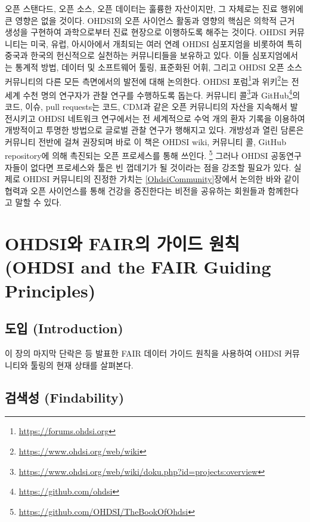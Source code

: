 \documentclass[11pt]{book}
\let\rmarkdownfootnote\footnote%
\def\footnote{\protect\rmarkdownfootnote}
\theoremstyle{definition}
\theoremstyle{definition}
\theoremstyle{definition}
\theoremstyle{remark}
\begin{document}
오픈 스탠다드, 오픈 소스, 오픈 데이터는 훌륭한 자산이지만, 그 자체로는
진료 행위에 큰 영향은 없을 것이다. OHDSI의 오픈 사이언스 활동과 영향의
핵심은 의학적 근거 생성을 구현하여 과학으로부터 진료 현장으로 이행하도록
해주는 것이다. OHDSI 커뮤니티는 미국, 유럽, 아시아에서 개최되는 여러
연례 OHDSI 심포지엄을 비롯하여 특히 중국과 한국의 헌신적으로 실천하는
커뮤니티들을 보유하고 있다. 이들 심포지엄에서는 통계적 방법, 데이터 및
소프트웨어 툴링, 표준화된 어휘, 그리고 OHDSI 오픈 소스 커뮤니티의 다른
모든 측면에서의 발전에 대해 논의한다. OHDSI 포럼\footnote{\url{https://forums.ohdsi.org}}과
위키\footnote{\url{https://www.ohdsi.org/web/wiki}}는 전 세계 수천 명의
연구자가 관찰 연구를 수행하도록 돕는다. 커뮤니티 콜\footnote{\url{https://www.ohdsi.org/web/wiki/doku.php?id=projects:overview}}과
GitHub\footnote{\url{https://github.com/ohdsi}}의 코드, 이슈, pull
requests는 코드, CDM과 같은 오픈 커뮤니티의 자산을 지속해서 발전시키고
OHDSI 네트워크 연구에서는 전 세계적으로 수억 개의 환자 기록을 이용하여
개방적이고 투명한 방법으로 글로벌 관찰 연구가 행해지고 있다. 개방성과
열린 담론은 커뮤니티 전반에 걸쳐 권장되며 바로 이 책은 OHDSI wiki,
커뮤니티 콜, GitHub repository에 의해 촉진되는 오픈 프로세스를 통해
쓰인다. \footnote{\url{https://github.com/OHDSI/TheBookOfOhdsi}} 그러나
OHDSI 공동연구자들이 없다면 프로세스와 툴은 빈 껍데기가 될 것이라는 점을
강조할 필요가 있다. 실제로 OHDSI 커뮤니티의 진정한 가치는
\ref{OhdsiCommunity}장에서 논의한 바와 같이 협력과 오픈 사이언스를 통해
건강을 증진한다는 비전을 공유하는 회원들과 함께한다고 말할 수 있다.

\section{OHDSI와 FAIR의 가이드 원칙 (OHDSI and the FAIR Guiding
Principles)}\label{ohdsi-fair---ohdsi-and-the-fair-guiding-principles}


\subsection{도입 (Introduction)}\label{-introduction}

이 장의 마지막 단락은 \citet{wilkinson2016} 등 발표한 FAIR 데이터 가이드
원칙을 사용하여 OHDSI 커뮤니티와 툴링의 현재 상태를 살펴본다.

\subsection{검색성 (Findability)}\label{-findability}
\end{document}

